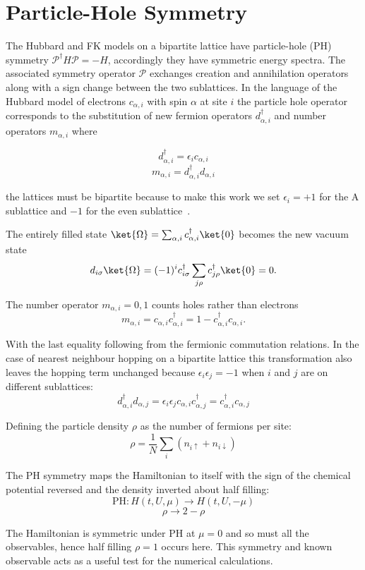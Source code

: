 \hypertarget{particle-hole-symmetry}{%
\section{Particle-Hole Symmetry}\label{particle-hole-symmetry}}

The Hubbard and FK models on a bipartite lattice have particle-hole (PH) symmetry \(\mathcal{P}^\dagger H \mathcal{P} = - H\), accordingly they have symmetric energy spectra. The associated symmetry operator \(\mathcal{P}\) exchanges creation and annihilation operators along with a sign change between the two sublattices. In the language of the Hubbard model of electrons \(c_{\alpha,i}\) with spin \(\alpha\) at site \(i\) the particle hole operator corresponds to the substitution of new fermion operators \(d^\dagger_{\alpha,i}\) and number operators \(m_{\alpha,i}\) where

\[d^\dagger_{\alpha,i} = \epsilon_i c_{\alpha,i}\] \[m_{\alpha,i} = d^\dagger_{\alpha,i}d_{\alpha,i}\]

the lattices must be bipartite because to make this work we set \(\epsilon_i = +1\) for the A sublattice and \(-1\) for the even sublattice~\autocite{gruberFalicovKimballModel2005}.

The entirely filled state \(\ket{\Omega} = \sum_{\alpha,i} c^\dagger_{\alpha,i} \ket{0}\) becomes the new vacuum state \[d_{i\sigma} \ket{\Omega} = (-1)^i c^\dagger_{i\sigma} \sum_{j\rho} c^\dagger_{j\rho} \ket{0} = 0.\]

The number operator \(m_{\alpha,i} = 0,1\) counts holes rather than electrons \[ m_{\alpha,i} = c_{\alpha,i} c^\dagger_{\alpha,i} = 1 - c^\dagger_{\alpha,i} c_{\alpha,i}.\]

With the last equality following from the fermionic commutation relations. In the case of nearest neighbour hopping on a bipartite lattice this transformation also leaves the hopping term unchanged because \(\epsilon_i \epsilon_j = -1\) when \(i\) and \(j\) are on different sublattices: \[ d^\dagger_{\alpha,i} d_{\alpha,j} = \epsilon_i \epsilon_j c_{\alpha,i} c^\dagger_{\alpha,j} = c^\dagger_{\alpha,i} c_{\alpha,j} \]

Defining the particle density \(\rho\) as the number of fermions per site: \[
    \rho = \frac{1}{N} \sum_i \left( n_{i \uparrow} + n_{i \downarrow} \right)
\]

The PH symmetry maps the Hamiltonian to itself with the sign of the chemical potential reversed and the density inverted about half filling: \[ \text{PH} : H(t, U, \mu) \rightarrow H(t, U, -\mu) \] \[ \rho \rightarrow 2 - \rho \]

The Hamiltonian is symmetric under PH at \(\mu = 0\) and so must all the observables, hence half filling \(\rho = 1\) occurs here. This symmetry and known observable acts as a useful test for the numerical calculations.
